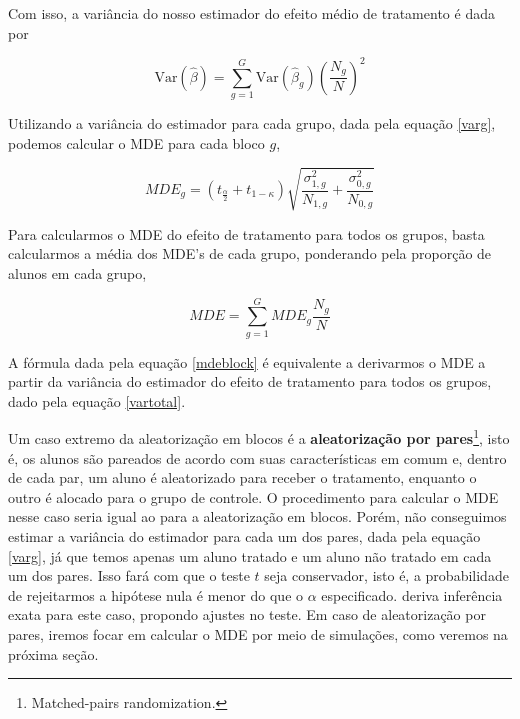 Com isso, a variância do nosso estimador do efeito médio de tratamento é dada por

\begin{equation}\label{vartotal}
    \mathrm{Var}(\hat{\beta}) = \sum_{g=1}^G \mathrm{Var}(\hat{\beta}_g) \left(\frac{N_g}{N}\right)^2
\end{equation}

Utilizando a variância do estimador para cada grupo, dada pela equação \ref{varg}, podemos calcular o MDE para cada bloco $g$,

\begin{equation}\label{mde3}
    MDE_g = (t_{\frac{\alpha}{2}} + t_{1-\kappa})\sqrt{\frac{\sigma^2_{1,g}}{N_{1,g}} + \frac{\sigma^2_{0,g}}{N_{0,g}}}
\end{equation}

Para calcularmos o MDE do efeito de tratamento para todos os grupos, basta calcularmos a média dos MDE's de cada grupo, ponderando pela proporção de alunos em cada grupo,

\begin{equation}\label{mdeblock}
    MDE = \sum_{g=1}^G MDE_g \frac{N_g}{N}
\end{equation}

A fórmula dada pela equação \ref{mdeblock} é equivalente a derivarmos o MDE a partir da variância do estimador do efeito de tratamento para todos os grupos, dado pela equação \ref{vartotal}.

Um caso extremo da aleatorização em blocos é a \textbf{aleatorização por pares}\footnote{Matched-pairs randomization.}, isto é, os alunos são pareados de acordo com suas características em comum e, dentro de cada par, um aluno é aleatorizado para receber o tratamento, enquanto o outro é alocado para o grupo de controle. O procedimento para calcular o MDE nesse caso seria igual ao para a aleatorização em blocos. Porém, não conseguimos estimar a variância do estimador para cada um dos pares, dada pela equação \ref{varg}, já que temos apenas um aluno tratado e um aluno não tratado em cada um dos pares. Isso fará com que o teste $t$ seja conservador, isto é, a probabilidade de rejeitarmos a hipótese nula é menor do que o $\alpha$ especificado. \cite{bai2022} deriva inferência exata para este caso, propondo ajustes no teste. Em caso de aleatorização por pares, iremos focar em calcular o MDE por meio de simulações, como veremos na próxima seção.

